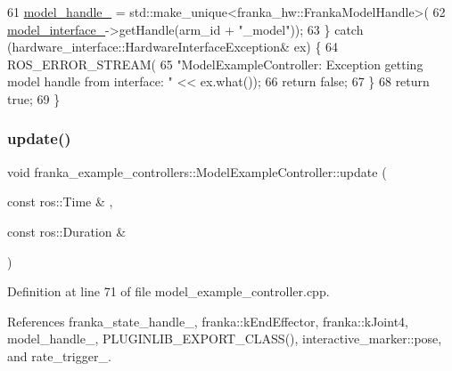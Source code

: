 \begin{DoxyCode}
61     \hyperlink{classfranka__example__controllers_1_1ModelExampleController_a6eb1270e267595e0e281ee765f0ec550}{model\_handle\_} = std::make\_unique<franka\_hw::FrankaModelHandle>(
62         \hyperlink{classfranka__example__controllers_1_1ModelExampleController_a832283a8b75f7e65ee03839a18b54f18}{model\_interface\_}->getHandle(arm\_id + \textcolor{stringliteral}{"\_model"}));
63   \} \textcolor{keywordflow}{catch} (hardware\_interface::HardwareInterfaceException& ex) \{
64     ROS\_ERROR\_STREAM(
65         \textcolor{stringliteral}{"ModelExampleController: Exception getting model handle from interface: "} << ex.what());
66     \textcolor{keywordflow}{return} \textcolor{keyword}{false};
67   \}
68   \textcolor{keywordflow}{return} \textcolor{keyword}{true};
69 \}
\end{DoxyCode}
\mbox{\label{classfranka__example__controllers_1_1ModelExampleController_ac80410c22f5e1c98da93ba150a390d2d}} 
\subsubsection{\texorpdfstring{update()}{update()}}
{\footnotesize\ttfamily void franka\+\_\+example\+\_\+controllers\+::\+Model\+Example\+Controller\+::update (\begin{DoxyParamCaption}\item[{const ros\+::\+Time \&}]{,  }\item[{const ros\+::\+Duration \&}]{ }\end{DoxyParamCaption})\hspace{0.3cm}{\ttfamily [override]}}



Definition at line 71 of file model\+\_\+example\+\_\+controller.\+cpp.



References franka\+\_\+state\+\_\+handle\+\_\+, franka\+::k\+End\+Effector, franka\+::k\+Joint4, model\+\_\+handle\+\_\+, P\+L\+U\+G\+I\+N\+L\+I\+B\+\_\+\+E\+X\+P\+O\+R\+T\+\_\+\+C\+L\+A\+S\+S(), interactive\+\_\+marker\+::pose, and rate\+\_\+trigger\+\_\+.


